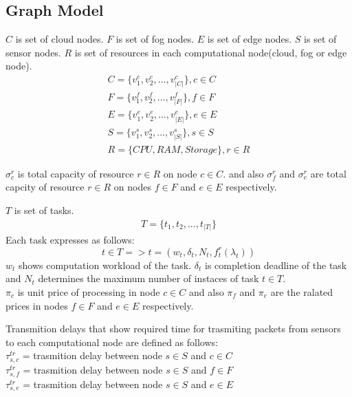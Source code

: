 \documentclass[conference]{IEEEtran}
\begin{document}
    \subsection{Graph Model}

    $C$ is set of cloud nodes.
    $F$ is set of fog nodes.
    $E$ is set of edge nodes.
    $S$ is set of sensor nodes.
    $R$ is set of resources in each computational node(cloud, fog or edge node).
    \begin{subequations}
      \begin{align}
          C = \{v_1^c, v_2^c, ..., v_{|C|}^c\} , c \in C\\
          F = \{v_1^f, v_2^f, ..., v_{|F|}^f\} , f \in F\\
          E = \{v_1^e, v_2^e, ..., v_{|E|}^e\} , e \in E\\
          S = \{v_1^s, v_2^s, ..., v_{|S|}^s\} , s \in S\\
          R = \{CPU, RAM, Storage\} , r \in R
      \end{align}
    \end{subequations}

    $\sigma_c^r$ is total capacity of resource $r \in R$ on node $c \in C$.
    and also $\sigma_f^r$ and $\sigma_e^r$ are total capcity of resource $r \in R$
    on nodes $f \in F$ and $e \in E$ respectively.

    $T$ is set of tasks.
    \begin{subequations}
      \begin{align}
          T = \{t_1, t_2, ..., t_{|T|}\}
      \end{align}
    \end{subequations}
    Each task expresses as follows:
    \begin{equation}
      t \in T => t = (w_t, \delta_t, N_t, f_t^r(\lambda_t))
    \end{equation}
    $w_t$ shows computation workload of the task.
    $\delta_t$ is completion deadline of the task and
    $N_t$ determines the maximum number of instaces of task $t \in T$.\\

    $\pi_c$ is unit price of processing in node $c \in C$ and also $\pi_f$
    and $\pi_e$ are the ralated prices in nodes $f \in F$ and $e \in E$ respectively.

    Transmition delays that show required time for trasmiting packets
    from sensors to each computational node are defined as follows:\\
    $\tau_{s,c}^{tr}$ = trasmition delay between node $s \in S$ and $c \in C$\\
    $\tau_{s,f}^{tr}$ = trasmition delay between node $s \in S$ and $f \in F$\\
    $\tau_{s,e}^{tr}$ = trasmition delay between node $s \in S$ and $e \in E$
\end{document}
